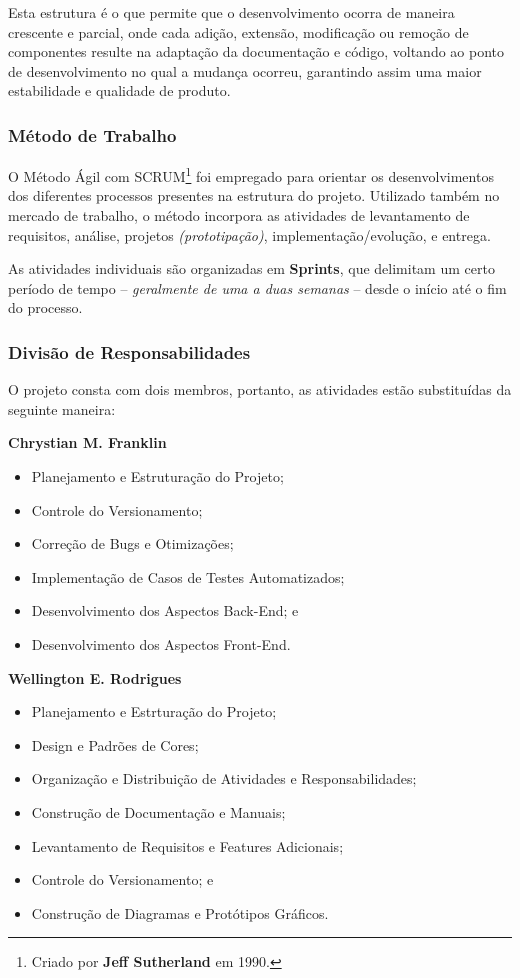 \documentclass[a4paper,12pt]{article}
\begin{document}
Esta estrutura é o que permite que o desenvolvimento ocorra de maneira crescente e parcial, onde cada adição, extensão,
 modificação ou remoção de componentes resulte na adaptação da documentação e código, voltando ao ponto de desenvolvimento 
 no qual a mudança ocorreu, garantindo assim uma maior estabilidade e qualidade de produto.

\subsubsection{Método de Trabalho}
O Método Ágil com SCRUM\footnote{
    Criado por \textbf{Jeff Sutherland} em 1990.
} foi empregado para orientar os desenvolvimentos dos diferentes processos presentes na estrutura do projeto. Utilizado também no mercado 
de trabalho, o método incorpora as atividades de levantamento de requisitos, análise, projetos \textit{(prototipação)}, 
implementação/evolução, e entrega.

As atividades individuais são organizadas em \textbf{Sprints}, que delimitam um certo período de 
tempo -- \textit{geralmente de uma a duas semanas} -- desde o início até o fim do processo.

\subsubsection{Divisão de Responsabilidades}
O projeto consta com dois membros, portanto, as atividades estão substituídas da seguinte maneira:

\vspace{2em}
\textbf{Chrystian M. Franklin}
\begin{itemize}
    	\item Planejamento e Estruturação do Projeto;
    	\item Controle do Versionamento;
    	\item Correção de Bugs e Otimizações;
    	\item Implementação de Casos de Testes Automatizados;
    	\item Desenvolvimento dos Aspectos Back-End; e
    	\item Desenvolvimento dos Aspectos Front-End.
\end{itemize}

\vspace{2em}
\textbf{Wellington E. Rodrigues}
\begin{itemize}
	\item Planejamento e Estrturação do Projeto;
    	\item Design e Padrões de Cores;
    	\item Organização e Distribuição de Atividades e Responsabilidades;
    	\item Construção de Documentação e Manuais;
   	\item Levantamento de Requisitos e Features Adicionais;
    	\item Controle do Versionamento; e
    	\item Construção de Diagramas e Protótipos Gráficos.

\end{itemize}
\end{document}
